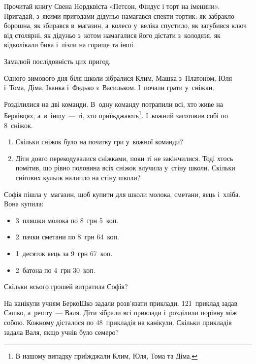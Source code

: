 \problem
Прочитай книгу Свена Нордквіста «Петсон, Фіндус і торт на іменини». Пригадай,
з~якими пригодами дідуньо намагався спекти тортик: як забракло борошна,
як збирався в~магазин, а~колесо у~веліка спустило, як загубився ключ
від столярні, як дідуньо з~котом намагалися його дістати з~колодязя,
як відволікали бика і~лізли на горище та інші.

Замалюй послідовність цих пригод.


\problem
Одного зимового дня біля школи зібралися Клим, Машка з~Платоном, Юля і~Тома,
Діма, Іванка і~Федько з~Васильком. І~почали грати у~сніжки.

Розділилися на дві команди. В~одну команду потрапили всі,
хто живе на Берківцях, а~в~іншу~--- ті, хто приїжджають\footnote{
  В нашому випадку приїжджали Клим, Юля, Тома та Діма.
}.
І~кожний заготовив собі по 8~сніжок.

\begin{enumerate}
  \item Скільки сніжок було на початку гри у~кожної команди?
  \item Діти довго перекодувалися сніжками, поки ті не закінчилися.
  Тоді хтось помітив, що рівно половина всіх сніжок влучила у~стіну школи.
  Скільки снігових кульок налипло на стіну школи?
\end{enumerate}


\problem
Софія пішла у~магазин, щоб купити для школи молока, сметани, яєць і~хліба.
Вона купила:
\begin{itemize}
  \item 3~пляшки молока по 8~грн 5~коп.
  \item 2~пачки сметани по 8~грн 64~коп.
  \item 1~десяток яєць за 9~грн 67~коп.
  \item 2~батона по 4~грн 30~коп.
\end{itemize}

Скільки всього грошей витратила Софія?


\problem
На канікули учням БеркоШко задали розв'язати приклади.
121~приклад задав Сашко, а~решту~--- Валя.
Діти зібрали всі приклади і~розділили порівну між собою.
Кожному дісталося по 48~прикладів на канікули.
Скільки прикладів задала Валя, якщо учнів було семеро?


